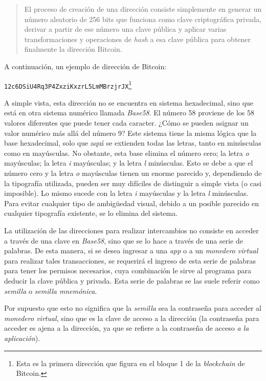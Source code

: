 \documentclass[12pt,a4paper,twoside]{book}
\begin{document}
\begin{quotation}
El proceso de creación de una dirección consiste simplemente en generar un número aleatorio de 256 bits que funciona como clave criptográfica privada, derivar a partir de ese número una clave pública y aplicar varias transformaciones y operaciones de \textit{hash} a esa clave pública para obtener finalmente la dirección Bitcoin. \cite{bitwiki:direccion}
\end{quotation}

A continuación, un ejemplo de dirección de Bitcoin:

\begin{center}
\texttt{12c6DSiU4Rq3P4ZxziKxzrL5LmMBrzjrJX}\footnote{Esta es la primera dirección que figura en el bloque 1 de la \textit{blockchain} de Bitcoin.}
\end{center}

A simple vista, esta dirección no se encuentra en sistema hexadecimal, sino que está en otra sistema numérico llamada \textit{Base58}. El número 58 proviene de los 58 valores diferentes que puede tener cada caracter. ¿Cómo se pueden asignar un valor numérico más allá del número 9? Este sistema tiene la misma lógica que la base hexadecimal, solo que aquí se extienden todas las letras, tanto en minúsculas como en mayúsculas. No obstante, esta base elimina el número cero; la letra \textit{o} mayúsculas; la letra \textit{i} mayúsculas; y la letra \textit{l} minúsculas. Esto se debe a que el número cero y la letra \textit{o} mayúsculas tienen un enorme parecido y, dependiendo de la tipografía utilizada, pueden ser muy difíciles de distinguir a simple vista (o casi imposible). Lo mismo sucede con la letra \textit{i} mayúsculas y la letra \textit{l} minúsculas. Para evitar cualquier tipo de ambigüedad visual, debido a un posible parecido en cualquier tipografía existente, se lo elimina del sistema.

La utilización de las direcciones para realizar intercambios no consiste en acceder a través de una clave en \textit{Base58}, sino que se lo hace a través de una serie de palabras. De esta manera, si se desea ingresar a una \textit{app} o a un \textit{monedero virtual} para realizar tales transacciones, se requerirá el ingreso de esta serie de palabras para tener los permisos necesarios, cuya combinación le sirve al programa para deducir la clave pública y privada. Esta serie de palabras se las suele referir como \textit{semilla} o \textit{semilla mnemónica}.

Por supuesto que esto no significa que la \textit{semilla} sea la contraseña para acceder al \textit{monedero virtual}, sino que es la clave de acceso a la dirección (la contraseña para acceder es ajena a la dirección, ya que se refiere a la contraseña de acceso \textit{a la aplicación}).
\end{document}
